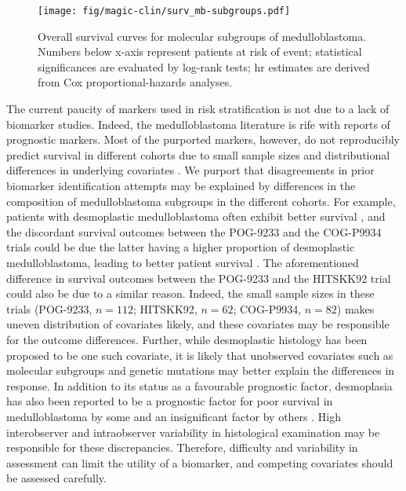 \begin{figure}[h]
	\begin{center}
		\texttt{[image: fig/magic-clin/surv\_mb-subgroups.pdf]}
	\end{center}
	\caption[Overall survival curves for molecular subgroups of medulloblastoma]
	{
		Overall survival curves for molecular subgroups of medulloblastoma.
		Numbers below x-axis represent patients at risk of event; statistical significances are evaluated by log-rank tests; \gls{hr} estimates are derived from Cox proportional-hazards analyses.
	}
	\label{fig:surv_mb-subgroups}
\end{figure}

\clearpage

The current paucity of markers used in risk stratification is not due to a lack of biomarker studies. Indeed, the medulloblastoma literature is rife with reports of prognostic markers. Most of the purported markers, however, do not reproducibly predict survival in different cohorts due to small sample sizes and distributional differences in underlying covariates . We purport that disagreements in prior biomarker identification attempts may be explained by differences in the composition of medulloblastoma subgroups in the different cohorts. For example, patients with desmoplastic medulloblastoma often exhibit better survival , and the discordant survival outcomes between the POG-9233 and the COG-P9934 trials could be due the latter having a higher proportion of desmoplastic medulloblastoma, leading to better patient survival . The aforementioned difference in survival outcomes between the POG-9233 and the HITSKK92 trial could also be due to a similar reason. Indeed, the small sample sizes in these trials (POG-9233, $n = 112$; HITSKK92, $n = 62 $; COG-P9934, $n = 82$) makes uneven distribution of covariates likely, and these covariates may be responsible for the outcome differences. Further, while desmoplastic histology has been proposed to be one such covariate, it is likely that unobserved covariates such as molecular subgroups and genetic mutations may better explain the differences in response. In addition to its status as a favourable prognostic factor, desmoplasia has also been reported to be a prognostic factor for poor survival in medulloblastoma by some  and an insignificant factor by others . High interobserver and intraobserver variability in histological examination may be responsible for these discrepancies. Therefore, difficulty and variability in assessment can limit the utility of a biomarker, and competing covariates should be assessed carefully.

